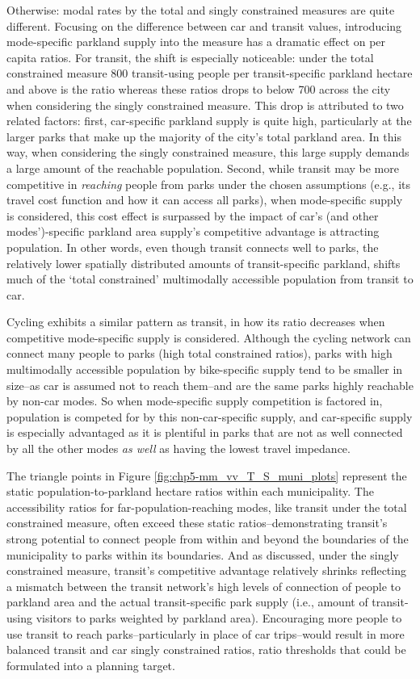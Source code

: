 \documentclass[
11pt, %
oneside, %
english, %
singlespacing, %
]{macthesis} %
\begin{document}
Otherwise: modal rates by the total and singly constrained measures are quite different. Focusing on the difference between car and transit values, introducing mode-specific parkland supply into the measure has a dramatic effect on per capita ratios. For transit, the shift is especially noticeable: under the total constrained measure 800 transit-using people per transit-specific parkland hectare and above is the ratio whereas these ratios drops to below 700 across the city when considering the singly constrained measure. This drop is attributed to two related factors: first, car-specific parkland supply is quite high, particularly at the larger parks that make up the majority of the city's total parkland area. In this way, when considering the singly constrained measure, this large supply demands a large amount of the reachable population. Second, while transit may be more competitive in \emph{reaching} people from parks under the chosen assumptions (e.g., its travel cost function and how it can access all parks), when mode-specific supply is considered, this cost effect is surpassed by the impact of car's (and other modes')-specific parkland area supply's competitive advantage is attracting population. In other words, even though transit connects well to parks, the relatively lower spatially distributed amounts of transit-specific parkland, shifts much of the `total constrained' multimodally accessible population from transit to car.

Cycling exhibits a similar pattern as transit, in how its ratio decreases when competitive mode-specific supply is considered. Although the cycling network can connect many people to parks (high total constrained ratios), parks with high multimodally accessible population by bike-specific supply tend to be smaller in size--as car is assumed not to reach them--and are the same parks highly reachable by non-car modes. So when mode-specific supply competition is factored in, population is competed for by this non-car-specific supply, and car-specific supply is especially advantaged as it is plentiful in parks that are not as well connected by all the other modes \emph{as well} as having the lowest travel impedance.

The triangle points in Figure \ref{fig:chp5-mm_vv_T_S_muni_plots} represent the static population-to-parkland hectare ratios within each municipality. The accessibility ratios for far-population-reaching modes, like transit under the total constrained measure, often exceed these static ratios--demonstrating transit's strong potential to connect people from within and beyond the boundaries of the municipality to parks within its boundaries. And as discussed, under the singly constrained measure, transit's competitive advantage relatively shrinks reflecting a mismatch between the transit network's high levels of connection of people to parkland area and the actual transit-specific park supply (i.e., amount of transit-using visitors to parks weighted by parkland area). Encouraging more people to use transit to reach parks--particularly in place of car trips--would result in more balanced transit and car singly constrained ratios, ratio thresholds that could be formulated into a planning target.
\end{document}
